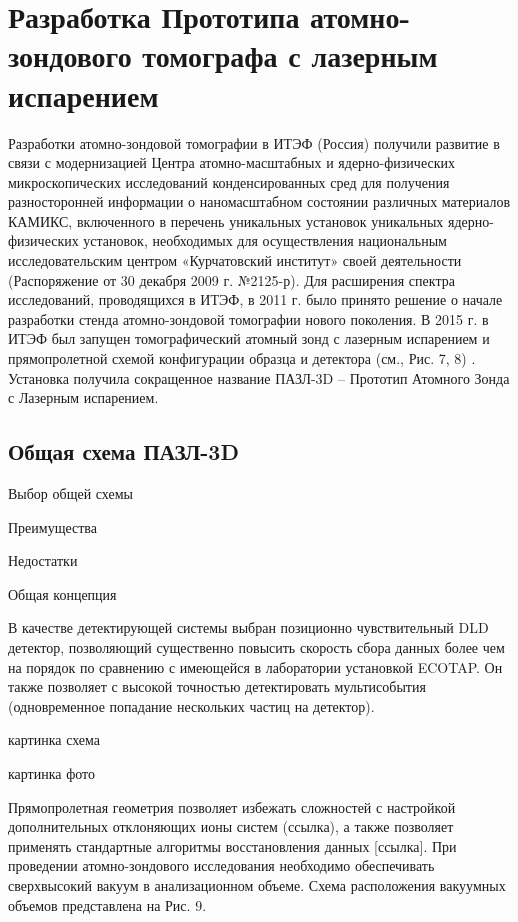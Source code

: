 \chapter{Разработка  Прототипа атомно-зондового томографа с лазерным испарением}\label{ch:ch2}

Разработки атомно-зондовой томографии в ИТЭФ (Россия) получили развитие в связи с модернизацией Центра атомно-масштабных и ядерно-физических микроскопических исследований конденсированных сред для получения разносторонней информации о наномасштабном состоянии различных материалов КАМИКС, включенного в перечень уникальных установок уникальных ядерно-физических установок, необходимых для осуществления национальным исследовательским центром «Курчатовский институт» своей деятельности (Распоряжение от 30 декабря 2009 г. №2125-р). Для расширения спектра исследований, проводящихся в ИТЭФ, в 2011 г. было принято решение о начале разработки стенда атомно-зондовой томографии нового поколения. В 2015 г. в ИТЭФ был запущен томографический атомный зонд с лазерным испарением и прямопролетной схемой конфигурации образца и детектора (см., Рис. 7, 8) \cite{scbibAPPLE}. Установка получила сокращенное название ПАЗЛ-3D – Прототип Атомного Зонда с Лазерным испарением. 

\section{Общая схема ПАЗЛ-3D}\label{sec:ch2/sec1}

Выбор общей схемы

Преимущества

Недостатки

Общая концепция

В качестве детектирующей системы выбран позиционно чувствительный DLD детектор, позволяющий существенно повысить скорость сбора данных более чем на порядок по сравнению с имеющейся в лаборатории установкой ECOTAP. Он также позволяет с высокой точностью детектировать мультисобытия (одновременное попадание нескольких частиц на детектор).

картинка схема

картинка фото


Прямопролетная геометрия позволяет избежать сложностей с настройкой дополнительных отклоняющих ионы систем (ссылка), а также позволяет применять стандартные алгоритмы восстановления данных [ссылка].  При проведении атомно-зондового исследования необходимо обеспечивать сверхвысокий вакуум в анализационном объеме. Схема расположения вакуумных объемов представлена на Рис. 9.

